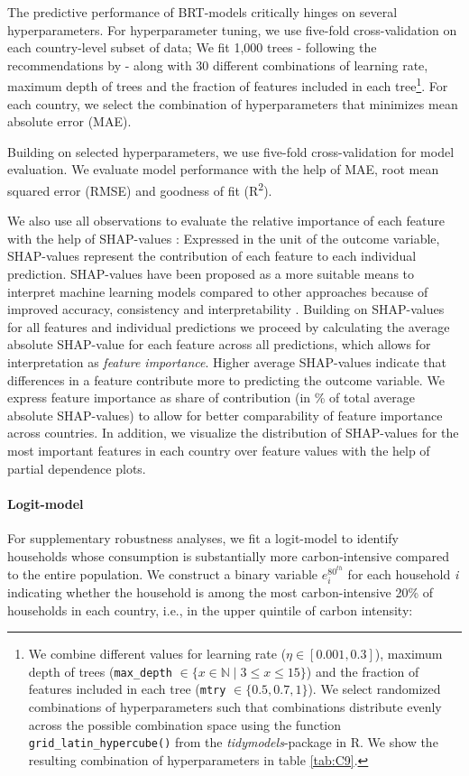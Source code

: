 \documentclass[12pt, a4paper]{article}
\begin{document}
The predictive performance of BRT-models critically hinges on several hyperparameters. For hyperparameter tuning, we use five-fold cross-validation on each country-level subset of data; We fit 1,000 trees - following the recommendations by \textcite{Elith.2008} - along with 30 different combinations of learning rate, maximum depth of trees and the fraction of features included in each tree\footnote{We combine different values for learning rate ($\eta \in [0.001,0.3]$), maximum depth of trees (\texttt{max\_depth} $\in \{x \in \mathbb{N} \mid 3  \leq x \leq 15 \}$) and the fraction of features included in each tree (\texttt{mtry} $\in \{0.5,0.7,1\}$). We select randomized combinations of hyperparameters such that combinations distribute evenly across the possible combination space using the function \texttt{grid\_latin\_hypercube()} from the \textit{tidymodels}-package in R. We show the resulting combination of hyperparameters in table \ref{tab:C9}.}. For each country, we select the combination of hyperparameters that minimizes mean absolute error (MAE).

Building on selected hyperparameters, we use five-fold cross-validation for model evaluation. We evaluate model performance with the help of MAE, root mean squared error (RMSE) and goodness of fit (R\textsuperscript{2}). 

We also use all observations to evaluate the relative importance of each feature with the help of SHAP-values \autocite{Lundberg.2017}: Expressed in the unit of the outcome variable, SHAP-values represent the contribution of each feature to each individual prediction. SHAP-values have been proposed as a more suitable means to interpret machine learning models compared to other approaches because of improved accuracy, consistency and interpretability \autocite{Lundberg.2020}. Building on SHAP-values for all features and individual predictions we proceed by calculating the average absolute SHAP-value for each feature across all predictions, which allows for interpretation as \textit{feature importance}. Higher average SHAP-values indicate that differences in a feature contribute more to predicting the outcome variable. We express feature importance as share of contribution (in \% of total average absolute SHAP-values) to allow for better comparability of feature importance across countries. In addition, we visualize the distribution of SHAP-values for the most important features in each country over feature values with the help of partial dependence plots. 

\paragraph{Logit-model} For supplementary robustness analyses, we fit a logit-model to identify households whose consumption is substantially more carbon-intensive compared to the entire population. We construct a binary variable $e_{i}^{80^{th}}$ for each household \textit{i} indicating whether the household is among the most carbon-intensive 20\% of households in each country, i.e., in the upper quintile of carbon intensity:
\end{document}
